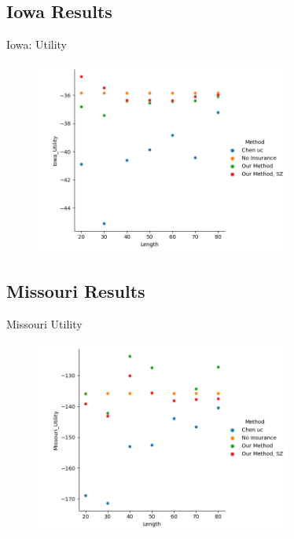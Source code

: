 \documentclass{beamer}
\begin{document}
\subsection*{Iowa Results}
\begin{frame}{Iowa: Utility}
    \begin{figure}
        \includegraphics[width=0.75\textwidth]{../../../output/figures/Midwest Evaluation/Iowa_Utility_Length.png}
    \end{figure}
\end{frame}

\subsection*{Missouri Results}
\begin{frame}{Missouri Utility}
    \begin{figure}
        \includegraphics[width=0.75\textwidth]{../../../output/figures/Midwest Evaluation/Missouri_Utility_Length.png}
    \end{figure}
\end{frame}
\end{document}
